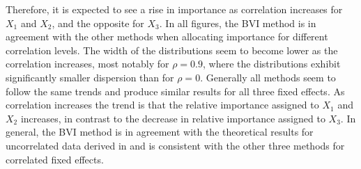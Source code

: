 Therefore, it is expected to see a rise in importance as correlation increases for $X_1$ and $X_2$, and the opposite for $X_3$.
In all figures, the BVI method is in agreement with the other methods when allocating importance for different correlation levels.
The width of the distributions seem to become lower as the correlation increases, most notably for $\rho=0.9$, where the distributions exhibit significantly smaller dispersion than for $\rho=0$.
Generally all methods seem to follow the same trends and produce similar results for all three fixed effects. 
As correlation increases the trend is that the relative importance assigned to $X_1$ and $X_2$ increases, in contrast to the decrease in relative importance assigned to $X_3$.
\newline
\newline
In general, the BVI method is in agreement with the theoretical results for uncorrelated data derived in  and is consistent with the other three methods for correlated fixed effects. 
